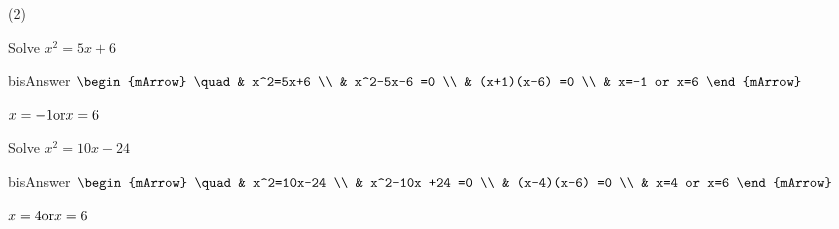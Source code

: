 \clearpage\noindent%

\begin{mtask}(2)
   \task \begin{exercise} Solve $x^2=5x+6$
              \begin{envOut}[height=6cm]{bisAnswer}
			     $\begin{mArrow}
			          \quad & x^2=5x+6      \\
                            & x^2-5x-6 =0 	\\
                            & (x+1)(x-6) =0 	\\
							& x=-1 or x=6
				  \end{mArrow}$
               \end{envOut}
               \begin{shortsolution}  
				       $x=-1 \textnormal{or} x=6$
			   \end{shortsolution}				 
         \end{exercise}




   \task \begin{exercise} Solve $x^2=10x-24$
              \begin{envOut}[height=6cm]{bisAnswer}
			     $\begin{mArrow}
			          \quad & x^2=10x-24      \\
                            & x^2-10x +24 =0 	\\
                            & (x-4)(x-6) =0 	\\
							& x=4 or x=6
				  \end{mArrow}$
               \end{envOut}
               \begin{shortsolution}  
				       $x=4 \textnormal{or} x=6$
			   \end{shortsolution}				 
         \end{exercise}

\end{mtask}
\clearpage
